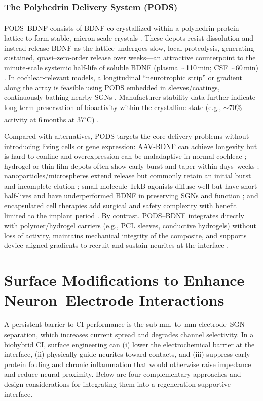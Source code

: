 \documentclass[referee,pdflatex, sn-vancouver-num]{sn-jnl}%
\theoremstyle{thmstyleone}%
\theoremstyle{thmstyletwo}%
\theoremstyle{thmstylethree}%
\begin{document}
\subsubsection{The Polyhedrin Delivery System (PODS\texorpdfstring{\textsuperscript{\textregistered}}{(R)})}
PODS\textsuperscript{\textregistered}–BDNF consists of BDNF co‑crystallized within a polyhedrin protein lattice to form stable, micron‑scale crystals \cite{Ikeda2006,Coulibaly2007,Coulibaly2009,Mori2007,Tanaka2007,Ijiri2009}. These depots resist dissolution and instead release BDNF as the lattice undergoes slow, local proteolysis, generating sustained, quasi–zero‑order release over weeks—an attractive counterpoint to the minute‑scale systemic half‑life of soluble BDNF (plasma $\sim$110\,min; CSF $\sim$60\,min) \cite{Mori2007,Poduslo1996,Sakane1997,Soderquist2009}. In cochlear‑relevant models, a longitudinal ``neurotrophic strip'' or gradient along the array is feasible using PODS embedded in sleeves/coatings, continuously bathing nearby SGNs \cite{Nella2022NeurotrophinGradients,Chang2020StemCellNiche}. Manufacturer stability data further indicate long‑term preservation of bioactivity within the crystalline state (e.g., $\sim$70\% activity at 6\,months at 37\textsuperscript{$\circ$}C) \cite{CellGS_PODS}.

Compared with alternatives, PODS targets the core delivery problems without introducing living cells or gene expression: AAV‑BDNF can achieve longevity but is hard to confine and overexpression can be maladaptive in normal cochleae \cite{Lee2016}; hydrogel or thin‑film depots often show early burst and taper within days–weeks \cite{Zimmermann2000}; nanoparticles/microspheres extend release but commonly retain an initial burst and incomplete elution \cite{Schmidt2018}; small‑molecule TrkB agonists diffuse well but have short half‑lives and have underperformed BDNF in preserving SGNs and function \cite{vink2022,heuer2021}; and encapsulated cell therapies add surgical and safety complexity with benefit limited to the implant period \cite{Pettingill2011}. By contrast, PODS–BDNF integrates directly with polymer/hydrogel carriers (e.g., PCL sleeves, conductive hydrogels) without loss of activity, maintains mechanical integrity of the composite, and supports device‑aligned gradients to recruit and sustain neurites at the interface \cite{Nella2022NeurotrophinGradients,Chang2020}.

\section{Surface Modifications to Enhance Neuron--Electrode Interactions}\label{sec:materials_stack}
\noindent
A persistent barrier to CI performance is the sub‑mm–to–mm electrode–SGN separation, which increases current spread and degrades channel selectivity. In a biohybrid CI, surface engineering can (i) lower the electrochemical barrier at the interface, (ii) physically guide neurites toward contacts, and (iii) suppress early protein fouling and chronic inflammation that would otherwise raise impedance and reduce neural proximity. Below are four complementary approaches and design considerations for integrating them into a regeneration‑supportive interface.
\end{document}
